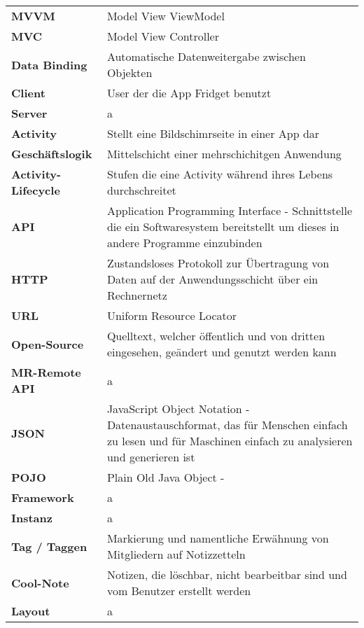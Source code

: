\begin{table}[h!]
			\centering
			\label{my-label}
			\begin{tabular}{p{4cm}p{10cm}}
				\textbf{MVVM} & Model View ViewModel  \\
				\textbf{MVC} & Model View Controller  \\
				\textbf{Data Binding} & Automatische Datenweitergabe zwischen Objekten  \\
				\textbf{Client} & User der die App Fridget benutzt   \\
				
				\textbf{Server} & a    \\
				\textbf{Activity} & Stellt eine Bildschimrseite in einer App dar   \\
				\textbf{Geschäftslogik} & Mittelschicht einer mehrschichitgen Anwendung  \\
				\textbf{Activity-Lifecycle}& Stufen die eine Activity während ihres Lebens durchschreitet   \\
				
				\textbf{API} & Application Programming Interface - Schnittstelle die ein Softwaresystem bereitstellt um dieses in andere Programme einzubinden  \\
				
			
				\textbf{HTTP} & Zustandsloses Protokoll zur Übertragung von Daten auf der Anwendungsschicht über ein Rechnernetz  \\
				\textbf{URL} & Uniform Resource Locator  \\
				\textbf{Open-Source} & Quelltext, welcher öffentlich und von dritten eingesehen, geändert und genutzt werden kann  \\
				
				\textbf{MR-Remote API} & a  \\
				\textbf{JSON} & JavaScript Object Notation - Datenaustauschformat, das für Menschen einfach zu lesen und für Maschinen einfach zu analysieren und generieren ist   \\
				\textbf{POJO} & Plain Old Java Object  -   \\
				\textbf{Framework} & a  \\
				
				\textbf{Instanz} & a  \\
				\textbf{Tag / Taggen} &  Markierung und namentliche Erwähnung von Mitgliedern auf Notizzetteln
   \\
				\textbf{Cool-Note} & Notizen, die löschbar, nicht bearbeitbar sind und vom Benutzer erstellt werden   \\
				\textbf{Layout} & a  \\
				

\end{tabular}
\end{table}
